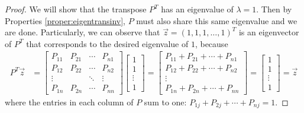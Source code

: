 \begin{proof}
We will show that the transpose $P^T$ has an eigenvalue of $\lambda = 1$. Then by Properties \ref{proper:eigentransinv}, $P$ must also share this same eigenvalue and we are done. Particularly, we can observe that $\vec{z} = (1,1,1,\ldots,1)^T$ is an eigenvector of $P^T$ that corresponds to the desired eigenvalue of $1$, because
\begin{align*}
P^T \vec{z} &= 
\begin{bmatrix}
P_{11} & P_{21} & \cdots & P_{n1} \\
P_{12} & P_{22} & \cdots & P_{n2} \\
\vdots & & \ddots & \vdots \\
P_{1n} & P_{2n} & \cdots & P_{nn}
\end{bmatrix}
\begin{bmatrix}
1 \\
1 \\
\vdots \\
1
\end{bmatrix}
=
\begin{bmatrix}
P_{11} + P_{21} + \cdots + P_{n1} \\
P_{12} + P_{22} + \cdots + P_{n2} \\
\vdots \\
P_{1n} + P_{2n} + \cdots + P_{nn}
\end{bmatrix}
=
\begin{bmatrix}
1 \\
1 \\
\vdots \\
1
\end{bmatrix}
= \vec{z}
\end{align*}
where the entries in each column of $P$ sum to one: $P_{1j} + P_{2j} + \cdots + P_{nj} = 1$.
\end{proof}

